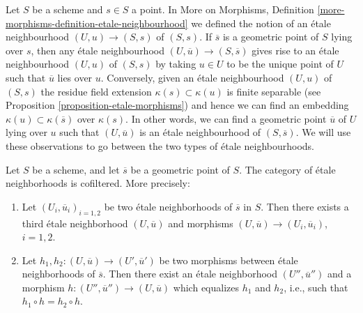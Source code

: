 \begin{remark}
\label{remark-etale-neighbourhoods}
Let $S$ be a scheme and $s \in S$ a point. In
More on Morphisms,
Definition \ref{more-morphisms-definition-etale-neighbourhood}
we defined the notion of an \'etale neighbourhood $(U, u) \to (S, s)$
of $(S, s)$. If $\overline{s}$ is a geometric point of $S$ lying over
$s$, then any \'etale neighbourhood $(U, \overline{u}) \to (S, \overline{s})$
gives rise to an \'etale neighbourhood $(U, u)$ of $(S, s)$ by taking
$u \in U$ to be the unique point of $U$ such that $\overline{u}$
lies over $u$. Conversely, given an \'etale neighbourhood $(U, u)$
of $(S, s)$ the residue field extension $\kappa(s) \subset \kappa(u)$
is finite separable (see
Proposition \ref{proposition-etale-morphisms})
and hence we can find an embedding $\kappa(u) \subset \kappa(\overline{s})$
over $\kappa(s)$. In other words, we can find a geometric point
$\overline{u}$ of $U$ lying over $u$ such that $(U, \overline{u})$
is an \'etale neighbourhood of $(S, \overline{s})$.
We will use these observations to go between the two types of
\'etale neighbourhoods.
\end{remark}

\begin{lemma}
\label{lemma-cofinal-etale}
Let $S$ be a scheme, and let $\overline{s}$ be a geometric point of $S$.
The category of \'etale neighborhoods is cofiltered. More precisely:
\begin{enumerate}
\item Let $(U_i, \overline{u}_i)_{i = 1, 2}$ be two \'etale neighborhoods of
$\overline{s}$ in $S$. Then there exists a third \'etale neighborhood
$(U, \overline{u})$ and morphisms
$(U, \overline{u}) \to (U_i, \overline{u}_i)$, $i = 1, 2$.
\item Let $h_1, h_2: (U, \overline{u}) \to (U', \overline{u}')$ be two
morphisms between \'etale neighborhoods of $\overline{s}$. Then there exist an
\'etale neighborhood $(U'', \overline{u}'')$ and a morphism
$h : (U'', \overline{u}'') \to (U, \overline{u})$
which equalizes $h_1$ and $h_2$, i.e., such that
$h_1 \circ h = h_2 \circ h$.
\end{enumerate}
\end{lemma}

